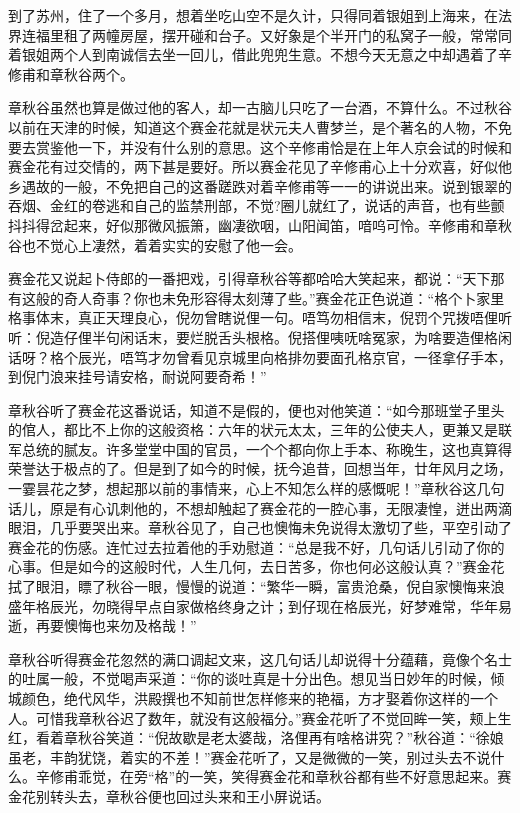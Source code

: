 \documentclass[12pt,UTF8]{ctexbook}
\begin{document}
{{{到了苏州，住了一个多月，想着坐吃山空不是久计，只得同着银姐到上海来，在法界连福里租了两幢房屋，摆开碰和台子。又好象是个半开门的私窝子一般，常常同着银姐两个人到南诚信去坐一回儿，借此兜兜生意。不想今天无意之中却遇着了辛修甫和章秋谷两个。

章秋谷虽然也算是做过他的客人，却一古脑儿只吃了一台酒，不算什么。不过秋谷以前在天津的时候，知道这个赛金花就是状元夫人曹梦兰，是个著名的人物，不免要去赏鉴他一下，并没有什么别的意思。这个辛修甫恰是在上年人京会试的时候和赛金花有过交情的，两下甚是要好。所以赛金花见了辛修甫心上十分欢喜，好似他乡遇故的一般，不免把自己的这番蹉跌对着辛修甫等一一的讲说出来。说到银翠的吞烟、金红的卷逃和自己的监禁刑部，不觉?圈儿就红了，说话的声音，也有些颤抖抖得岔起来，好似那微风振箫，幽凄欲咽，山阳闻笛，喑呜可怜。辛修甫和章秋谷也不觉心上凄然，着着实实的安慰了他一会。

赛金花又说起卜侍郎的一番把戏，引得章秋谷等都哈哈大笑起来，都说：“天下那有这般的奇人奇事？你也未免形容得太刻薄了些。”赛金花正色说道：“格个卜家里格事体末，真正天理良心，倪勿曾瞎说俚一句。唔笃勿相信末，倪罚个咒拨唔俚听听：倪造仔俚半句闲话末，要烂脱舌头根格。倪搭俚咦呒啥冤家，为啥要造俚格闲话呀？格个辰光，唔笃才勿曾看见京城里向格排勿要面孔格京官，一径拿仔手本，到倪门浪来挂号请安格，耐说阿要奇希！”

章秋谷听了赛金花这番说话，知道不是假的，便也对他笑道：“如今那班堂子里头的倌人，都比不上你的这般资格：六年的状元太太，三年的公使夫人，更兼又是联军总统的腻友。许多堂堂中国的官员，一个个都向你上手本、称晚生，这也真算得荣誉达于极点的了。但是到了如今的时候，抚今追昔，回想当年，廿年风月之场，一霎昙花之梦，想起那以前的事情来，心上不知怎么样的感慨呢！”章秋谷这几句话儿，原是有心讥刺他的，不想却触起了赛金花的一腔心事，无限凄惶，迸出两滴眼泪，几乎要哭出来。章秋谷见了，自己也懊悔未免说得太激切了些，平空引动了赛金花的伤感。连忙过去拉着他的手劝慰道：“总是我不好，几句话儿引动了你的心事。但是如今的这般时代，人生几何，去日苦多，你也何必这般认真？”赛金花拭了眼泪，瞟了秋谷一眼，慢慢的说道：“繁华一瞬，富贵沧桑，倪自家懊悔来浪盛年格辰光，勿晓得早点自家做格终身之计；到仔现在格辰光，好梦难常，华年易逝，再要懊悔也来勿及格哉！”

章秋谷听得赛金花忽然的满口调起文来，这几句话儿却说得十分蕴藉，竟像个名士的吐属一般，不觉喝声采道：“你的谈吐真是十分出色。想见当日妙年的时候，倾城颜色，绝代风华，洪殿撰也不知前世怎样修来的艳福，方才娶着你这样的一个人。可惜我章秋谷迟了数年，就没有这般福分。”赛金花听了不觉回眸一笑，颊上生红，看着章秋谷笑道：“倪故歇是老太婆哉，洛俚再有啥格讲究？”秋谷道：“徐娘虽老，丰韵犹饶，着实的不差！”赛金花听了，又是微微的一笑，别过头去不说什么。辛修甫乖觉，在旁“格”的一笑，笑得赛金花和章秋谷都有些不好意思起来。赛金花别转头去，章秋谷便也回过头来和王小屏说话。

}}}
\end{document}
